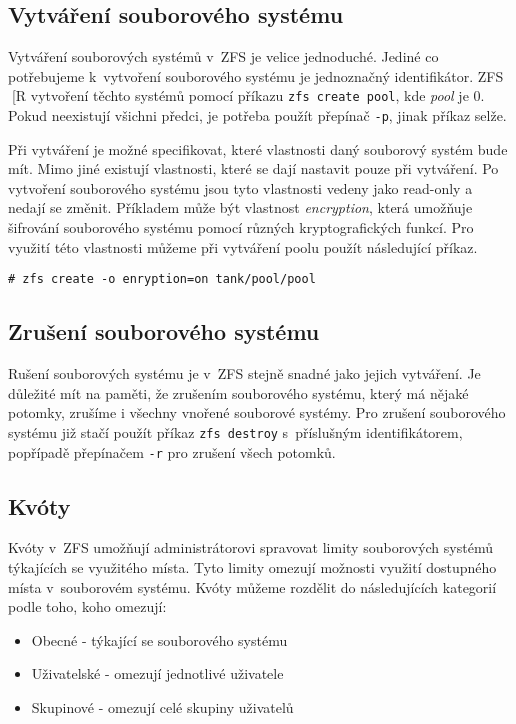 \subsection{Vytváření souborového systému}
\label{createfs}
Vytváření souborových systémů v~ZFS je velice jednoduché. Jediné co potřebujeme k~vytvoření souborového systému je jednoznačný identifikátor. ZFS [R vytvoření těchto systémů pomocí příkazu \verb|zfs create pool|, kde \emph{pool} je 0. Pokud neexistují všichni předci, je potřeba použít přepínač \verb|-p|, jinak příkaz selže.

Při vytváření je možné specifikovat, které vlastnosti daný souborový systém bude mít. Mimo jiné existují vlastnosti, které se dají nastavit pouze při vytváření. Po vytvoření souborového systému jsou tyto vlastnosti vedeny jako read-only a nedají se změnit. Příkladem může být vlastnost \emph{encryption}, která umožňuje šifrování souborového systému pomocí různých kryptografických funkcí. Pro využití této vlastnosti můžeme při vytváření poolu použít následující příkaz.
\begin{verbatim}
# zfs create -o enryption=on tank/pool/pool
\end{verbatim}
\subsection{Zrušení souborového systému}
Rušení souborových systému je v~ZFS stejně snadné jako jejich vytváření. Je důležité mít na paměti, že zrušením souborového systému, který má nějaké potomky, zrušíme i všechny vnořené souborové systémy. Pro zrušení souborového systému již stačí použít příkaz \verb|zfs destroy| s~příslušným identifikátorem, popřípadě přepínačem \verb|-r| pro zrušení všech potomků.
\subsection{Kvóty}
\label{quota}

Kvóty v~ZFS umožňují administrátorovi spravovat limity souborových systémů týkajících se využitého místa. Tyto limity omezují možnosti využití dostupného místa v~souborovém systému. Kvóty můžeme rozdělit do následujících kategorií podle toho, koho omezují:
\begin{itemize}
  \item Obecné - týkající se souborového systému
  \item Uživatelské - omezují jednotlivé uživatele
  \item Skupinové - omezují celé skupiny uživatelů
\end{itemize}

